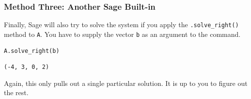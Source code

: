 \documentclass[10pt,]{book}
\theoremstyle{plain}
\theoremstyle{definition}
\numberwithin{equation}{section}
\begin{document}
\subsubsection[Method Three: Another Sage Built-in]{Method Three: Another Sage Built-in}\label{subsubsection-38}

        Finally, Sage will also try to solve the system if you apply the
        \verb?.solve_right()? method to \verb?A?. You have to supply the vector
        \verb?b? as an argument to the command.
\begin{lstlisting}[style=sageinput]
A.solve_right(b)
\end{lstlisting}
\begin{lstlisting}[style=sageoutput]
(-4, 3, 0, 2)
\end{lstlisting}
\par

        Again, this only pulls out a single particular solution. It is up to you
        to figure out the rest.
\typeout{************************************************}
\typeout{************************************************}
\end{document}
